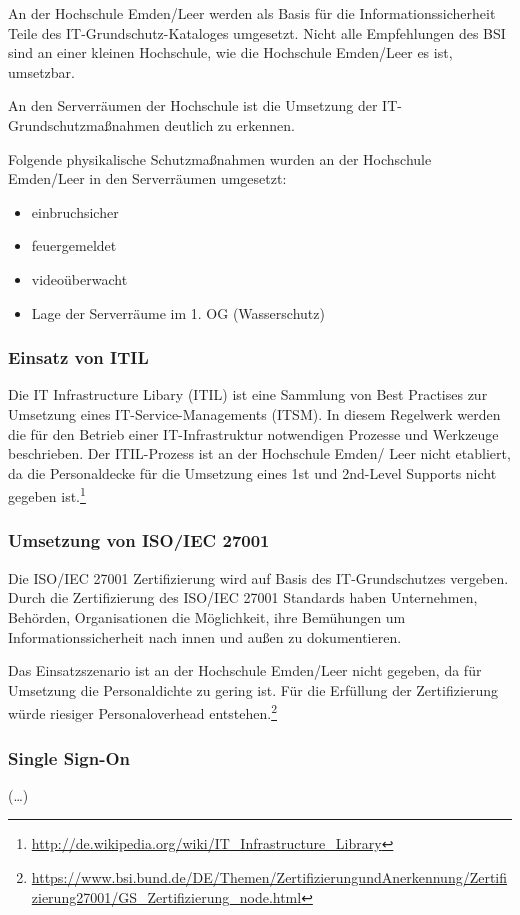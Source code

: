 An der Hochschule Emden/Leer werden als Basis für die Informationssicherheit Teile des IT-Grundschutz-Kataloges umgesetzt. Nicht alle Empfehlungen des BSI sind an einer kleinen Hochschule, wie die Hochschule Emden/Leer es ist, umsetzbar.

An den Serverräumen der Hochschule ist die Umsetzung der IT-Grundschutzmaßnahmen deutlich zu erkennen.

Folgende physikalische Schutzmaßnahmen wurden an der Hochschule Emden/Leer in den Serverräumen umgesetzt:

\begin{itemize}
	\item einbruchsicher
	\item feuergemeldet
	\item videoüberwacht
	\item Lage der Serverräume im 1. OG (Wasserschutz)
\end{itemize}

\subsubsection{Einsatz von ITIL}
Die IT Infrastructure Libary (ITIL) ist eine Sammlung von Best Practises zur Umsetzung eines IT-Service-Managements (ITSM). In diesem Regelwerk werden die für den Betrieb einer IT-Infrastruktur notwendigen Prozesse und Werkzeuge beschrieben.
Der ITIL-Prozess ist an der Hochschule Emden/ Leer nicht etabliert, da die Personaldecke für die Umsetzung eines 1st und 2nd-Level Supports nicht gegeben ist.\footnote{\url{http://de.wikipedia.org/wiki/IT_Infrastructure_Library}}

\subsubsection{Umsetzung von ISO/IEC 27001}
Die ISO/IEC 27001 Zertifizierung wird auf Basis des IT-Grundschutzes vergeben. Durch die Zertifizierung des ISO/IEC 27001 Standards haben Unternehmen, Behörden, Organisationen die Möglichkeit, ihre Bemühungen um Informationssicherheit nach innen und außen zu dokumentieren.

Das Einsatzszenario ist an der Hochschule Emden/Leer nicht gegeben, da für Umsetzung die Personaldichte zu gering ist. Für die Erfüllung der Zertifizierung würde riesiger Personaloverhead entstehen.\footnote{\url{https://www.bsi.bund.de/DE/Themen/ZertifizierungundAnerkennung/Zertifizierung27001/GS_Zertifizierung_node.html}}

\subsubsection{Single Sign-On}
(\ldots)

